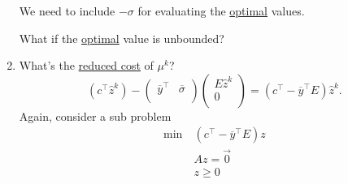 \begin{prev}
\begin{enumerate}
		      \begin{note}
			      We need to include \(-\sigma\) for evaluating the \hyperref[def:optimal-solution]{optimal} values.
		      \end{note}

		      \begin{problem}
		      What if the \hyperref[def:optimal-solution]{optimal} value is unbounded?
		      \end{problem}
		\item What's the \hyperref[def:reduced-cost]{reduced cost} of \(\mu^k\)?
		      \[
			      (c^{\top}\hat{z}^k) - \begin{pmatrix}
				      \overline{y}^{\top} & \overline{\sigma} \\
			      \end{pmatrix}\begin{pmatrix}
				      E \hat{z}^k \\
				      0           \\
			      \end{pmatrix} =  (c^{\top} - \overline{y}^{\top}E)\hat{z}^k.
		      \]
		      Again, consider a sub problem
		      \begin{align*}
			      \min~ & (c^{\top} - \overline{y}^{\top}E)z \\
			            & Az = \vec{0}                       \\
			            & z\geq 0
		      \end{align*}


\end{enumerate}
\end{prev}
